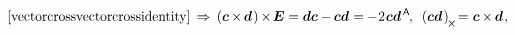 \vspace{-0.8em}\noindent
{}
%
\begin{equation*}
\eqref{vectorcrossvectorcrossidentity}
\hspace{.2em} \Rightarrow \hspace{.2em}
\left( \bm{c} \hspace{-0.1ex} \times \hspace{-0.2ex} \bm{d} \hspace{.2ex} \right) \hspace{-0.12ex} \times \hspace{-0.25ex} \UnitDyad
= \bm{d} \bm{c} - \hspace{-0.1ex} \bm{c} \bm{d} \hspace{.1ex}
= \hspace{-0.1ex} - \hspace{.1ex} 2 \hspace{.15ex} \bm{c}\bm{d}^{\mathsf{\hspace{.3ex}A}}
\hspace{-0.2ex} ,
\hspace{.5em}
\left( \bm{c} \bm{d} \hspace{.2ex} \right)_{\hspace{-0.15ex}\Xcompanion}
\hspace{-0.3ex} = \hspace{.1ex}
\bm{c} \hspace{-0.1ex} \times \hspace{-0.15ex} \bm{d}
\hspace{.2ex} ,
\end{equation*}

\nopagebreak\vspace{-0.1em}\noindent
{}

